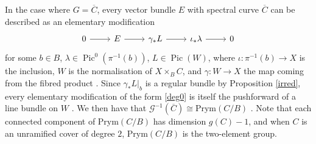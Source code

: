 \documentclass{article}[12pt]
\theoremstyle{definition}
\theoremstyle{remark}
\numberwithin{equation}{section}
\newcommand \mc{\mathcal}
\DeclareMathOperator{\Pic}{Pic}
\begin{document}
In the case where $G=\overline{C}$, every vector bundle  $E$ with spectral curve $\overline{C}$ can be described as an elementary modification \begin{equation}\begin{tikzcd}
		0 \arrow[r] & E \arrow[r] & \gamma_*L \arrow[r] & \iota_*\lambda \arrow[r] & 0
	\end{tikzcd}\label{deg0}\end{equation}
for some $b \in B$, $\lambda\in \Pic^0(\pi^{-1}(b))$, $L \in \Pic(W)$, where $\iota:\pi^{-1}(b)\to X$ is the inclusion, $W$ is the normalisation of $X\times_B C$, and $\gamma:W\to X$ the map coming from the fibred product \cite{ApTom}. Since $\gamma_*L|_{b}$ is a regular bundle by Proposition \ref{irred}, every elementary modification of the form \eqref{deg0} is itself the pushforward of a line bundle on $W$ \cite[Remarque 5]{ApTom}. We then have that $\mc{G}^{-1}(\overline{C})\cong \text{Prym}(C/B)$ \cite[Theorem 4.5]{BrMoFM}. Note that each connected component of $\text{Prym}(C/B)$ has dimension $g(C)-1$, and when $C$ is an unramified cover of degree $2$, $\text{Prym}(C/B)$ is the two-element group.
\end{document}
